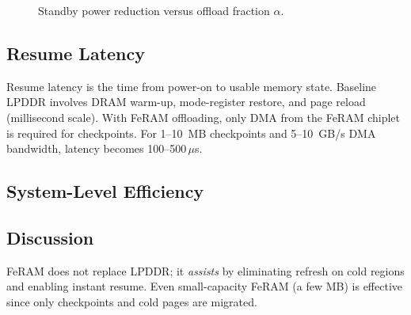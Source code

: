 \begin{figure}[t]
  \centering
  \vspace{-1ex}
  \caption{Standby power reduction versus offload fraction $\alpha$.}
  \label{fig:standby_reduction}
\end{figure}

\subsection{Resume Latency}
Resume latency is the time from power-on to usable memory state.
Baseline LPDDR involves DRAM warm-up, mode-register restore, and page reload (millisecond scale).
With FeRAM offloading, only DMA from the FeRAM chiplet is required for checkpoints.
For 1--10~MB checkpoints and 5--10~GB/s DMA bandwidth, latency becomes 100--500\,$\mu$s.

\subsection{System-Level Efficiency}
\begin{table}[t]
  \centering
  \caption{System-level efficiency impact of LPDDR+FeRAM integration.}
  \label{tab:sys_efficiency}
  \small
  \setlength{\tabcolsep}{4pt}
  \vspace{-1.0mm}
\end{table}

\subsection{Discussion}
FeRAM does not replace LPDDR; it \emph{assists} by eliminating refresh on cold regions and enabling instant resume.
Even small-capacity FeRAM (a few MB) is effective since only checkpoints and cold pages are migrated.
